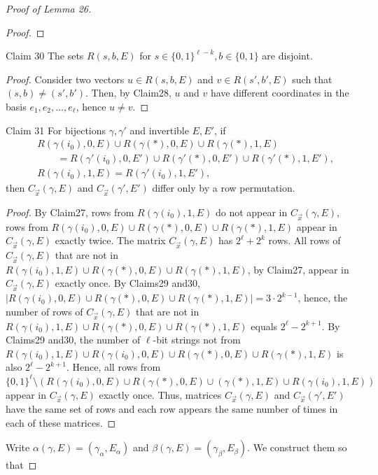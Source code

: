 \begin{proof}[Proof of Lemma 26]
\begin{proof}
\end{proof}
\begin{authorclaim}{Claim 30}
The sets $R(s,b,E)$ for $s\in\{0,1\}^{\ell-k},b\in\{0,1\}$ are disjoint.
\end{authorclaim}
\begin{proof}
Consider two vectors $u\in R(s,b,E)$ and $v\in R(s',b',E)$ such that $(s,b)\ne(s',b')$. Then, by Claim28, $u$ and $v$ have different coordinates in the basis $e_1,e_2,\ldots,e_\ell$, hence $u\ne v$.
\end{proof}
\begin{authorclaim}{Claim 31}
For bijections $\gamma,\gamma'$ and invertible $E,E'$, if
\begin{align*}
&R(\gamma(i_0),0,E)\cup R(\gamma(*),0,E)\cup R(\gamma(*),1,E)\\
&\qquad=R(\gamma'(i_0),0,E')\cup R(\gamma'(*),0,E')\cup R(\gamma'(*),1,E'),\\
&R(\gamma(i_0),1,E)=R(\gamma'(i_0),1,E'),
\end{align*}
then $C_{\vec x}(\gamma,E)$ and $C_{\vec x}(\gamma',E')$ differ only by a row permutation.
\end{authorclaim}
\begin{proof}
By Claim27, rows from $R(\gamma(i_0),1,E)$ do not appear in $C_{\vec x}(\gamma,E)$, rows from $R(\gamma(i_0),0,E)\cup R(\gamma(*),0,E)\cup R(\gamma(*),1,E)$ appear in $C_{\vec x}(\gamma,E)$ exactly twice. The matrix $C_{\vec x}(\gamma,E)$ has $2^\ell+2^k$ rows. All rows of $C_{\vec x}(\gamma,E)$ that are not in $R(\gamma(i_0),1,E)\cup R(\gamma(*),0,E)\cup R(\gamma(*),1,E)$, by Claim27, appear in $C_{\vec x}(\gamma,E)$ exactly once.
By Claims29 and30, $|R(\gamma(i_0),0,E)\cup R(\gamma(*),0,E)\cup R(\gamma(*),1,E)|=3\cdot2^{k-1}$, hence, the number of rows of $C_{\vec x}(\gamma,E)$ that are not in $R(\gamma(i_0),1,E)\cup R(\gamma(*),0,E)\cup R(\gamma(*),1,E)$ equals $2^\ell-2^{k+1}$. By Claims29 and30, the number of $\ell$-bit strings not from $R(\gamma(i_0),1,E)\cup R(\gamma(i_0),0,E)\cup R(\gamma(*),0,E)\cup R(\gamma(*),1,E)$ is also $2^\ell-2^{k+1}$. Hence, all rows from $\{0,1\}^\ell\setminus(R(\gamma(i_0),0,E)\cup R(\gamma(*),0,E)\cup(\gamma(*),1,E)\cup R(\gamma(i_0),1,E))$ appear in $C_{\vec x}(\gamma,E)$ exactly once. Thus, matrices $C_{\vec x}(\gamma,E)$ and $C_{\vec x}(\gamma',E')$ have the same set of rows and each row appears the same number of times in each of these matrices.
\end{proof}
Write $\alpha(\gamma,E)=(\gamma_\alpha,E_\alpha)$ and $\beta(\gamma,E)=(\gamma_\beta,E_\beta)$. We construct them so that

\end{proof}
